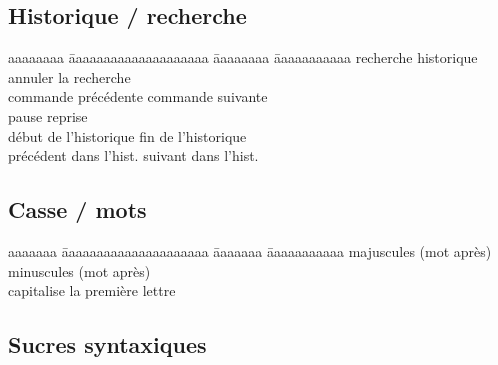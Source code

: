 \documentclass{article}
\let\oldkeys\keys
\renewcommand{\keys}[1]{\small\oldkeys{#1}\normalsize}
\begin{document}
\begin{multicols}{4}
    \subsection*{Historique / recherche}

    \begin{tabbing}
        aaaaaaaa \= aaaaaaaaaaaaaaaaaaaa \= aaaaaaaa \= aaaaaaaaaaa \kill
         \> recherche historique                \>
         \> annuler la recherche                \\
         \> commande précédente                 \>
         \> commande suivante                   \\
         \> pause                               \>
         \> reprise                             \\
        \keys{\Alt + <}  \> début de l'historique               \>
        \keys{\Alt + >}  \> fin de l'historique                 \\
          \> précédent dans l'hist.         \>
          \> suivant dans l'hist.
    \end{tabbing}

    \subsection*{Casse / mots}

    \begin{tabbing}
        aaaaaaa \= aaaaaaaaaaaaaaaaaaaaa \= aaaaaaa \= aaaaaaaaaaa \kill
         \> majuscules (mot après)        \>
         \> minuscules (mot après)        \\
         \> capitalise la première lettre
    \end{tabbing}

    \subsection*{Sucres syntaxiques}


\end{multicols}
\end{document}
